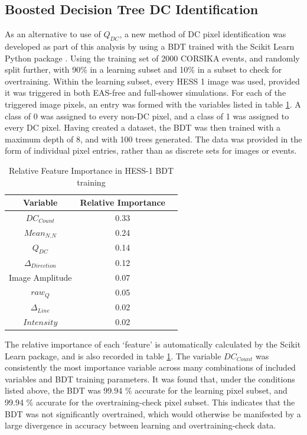 \documentclass[11pt]{article}
\begin{document}
\subsection{Boosted Decision Tree DC Identification}
As an alternative to use of $Q_{DC}$, a new method of DC pixel identification was developed as part of this analysis by using a BDT trained with the Scikit Learn Python package \cite{scikit-learn}. Using the training set of 2000 CORSIKA events, and randomly split further, with 90\% in a learning subset and 10\% in a subset to check for overtraining. Within the learning subset, every HESS 1 image was used, provided it was triggered in both EAS-free and full-shower simulations. For each of the triggered image pixels, an entry was formed with the variables listed in table \ref{tab:hess1classifier}. A class of 0 was assigned to every non-DC pixel, and a class of 1 was assigned to every DC pixel. Having created a dataset, the BDT was then trained with a maximum depth of 8, and with 100 trees generated. The data was provided in the form of individual pixel entries, rather than as discrete sets for images or events.

\begin{table}[h!]
  \centering
  \caption{Relative Feature Importance in HESS-1 BDT training}
  \label{tab:hess1classifier}
  \begin{tabular}{ccc}
    \toprule
    Variable & Relative Importance\\
    \midrule
    $DC_{Count}$ & 0.33\\
    $Mean_{N.N}$ & 0.24\\
    $Q_{DC}$ & 0.14\\
    $\Delta_{Direction}$ & 0.12\\
    Image Amplitude & 0.07\\
    $raw_{Q}$ & 0.05\\
    $\Delta_{Line}$ & 0.02\\
    $Intensity$ & 0.02\\
    \bottomrule
  \end{tabular}
\end{table}

The relative importance of each \textquoteleft feature' is automatically calculated by the Scikit Learn package, and is also recorded in table \ref{tab:hess1classifier}. The variable $DC_{Count}$ was consistently the most importance variable across many combinations of included variables and BDT training parameters. It was found that, under the conditions listed above, the BDT was 99.94 \% accurate for the learning pixel subset, and 99.94 \%  accurate for the overtraining-check pixel subset. This indicates that the BDT was not significantly overtrained, which would otherwise be manifested by a large divergence in accuracy between learning and overtraining-check data.
\end{document}
